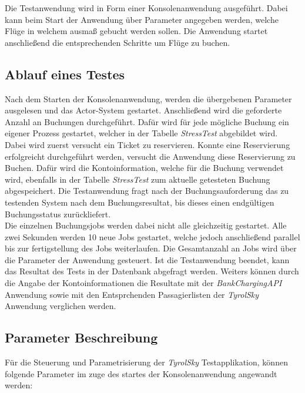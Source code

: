 Die Testanwendung wird in Form einer Konsolenanwendung ausgeführt. Dabei kann beim Start der Anwendung über Parameter angegeben werden, welche Flüge in welchem ausmaß gebucht werden sollen. Die Anwendung startet anschließend die entsprechenden Schritte um Flüge zu buchen. 

\subsection{Ablauf eines Testes}
Nach dem Starten der Konsolenanwendung, werden die übergebenen Parameter ausgelesen und das Actor-System gestartet. Anschließend wird die geforderte Anzahl an Buchungen durchgeführt. Dafür wird für jede mögliche Buchung ein eigener Prozess gestartet, welcher in der Tabelle \textit{StressTest} abgebildet wird. Dabei wird zuerst versucht ein Ticket zu reservieren. Konnte eine Reservierung erfolgreicht durchgeführt werden, versucht die Anwendung diese Reservierung zu Buchen. Dafür wird die Kontoinformation, welche für die Buchung verwendet wird, ebenfalls in der Tabelle \textit{StressTest} zum aktuelle getesteten Buchung abgespeichert. Die Testanwendung fragt nach der Buchungsauforderung das zu testenden System nach dem Buchungsresultat, bis dieses einen endgültigen Buchungsstatus zurückliefert. \\
Die einzelnen Buchungsjobs werden dabei nicht alle gleichzeitig gestartet. Alle zwei Sekunden werden 10 neue Jobs gestartet, welche jedoch anschließend parallel bis zur fertigstellung des Jobs weiterlaufen. Die Gesamtanzahl an Jobs wird über die Parameter der Anwendung gesteuert. Ist die Testanwendung beendet, kann das Resultat des Tests in der Datenbank abgefragt werden. Weiters können durch die Angabe der Kontoinformationen die Resultate mit der \textit{BankChargingAPI} Anwendung sowie mit den Entsprchenden Passagierlisten der \textit{TyrolSky} Anwendung verglichen werden.

\subsection{Parameter Beschreibung}
Für die Steuerung und Parametrisierung der \textit{TyrolSky} Testapplikation, können folgende Parameter im zuge des startes der Konsolenanwendung angewandt werden:



